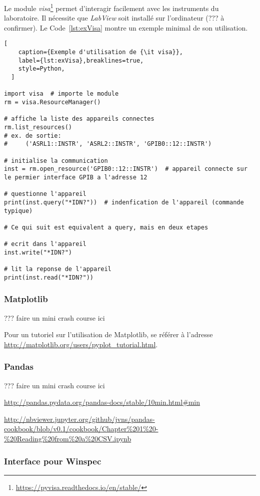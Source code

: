 \documentclass[11pt,francais]{book} %
\begin{document}
Le module {\it visa}\footnote{\url{https://pyvisa.readthedocs.io/en/stable/}} permet d'interagir facilement avec les instruments du laboratoire.
Il nécessite que {\it LabView} soit installé sur l'ordinateur (??? à confirmer).
Le Code~\ref{lst:exVisa} montre un exemple minimal de son utilisation.

\begin{lstlisting}[
    caption={Exemple d'utilisation de {\it visa}},
    label={lst:exVisa},breaklines=true,
    style=Python,
  ]  
 
import visa  # importe le module
rm = visa.ResourceManager()

# affiche la liste des appareils connectes
rm.list_resources()  
# ex. de sortie:
#     ('ASRL1::INSTR', 'ASRL2::INSTR', 'GPIB0::12::INSTR')

# initialise la communication
inst = rm.open_resource('GPIB0::12::INSTR')  # appareil connecte sur le permier interface GPIB a l'adresse 12

# questionne l'appareil
print(inst.query("*IDN?"))  # indenfication de l'appareil (commande typique)

# Ce qui suit est equivalent a query, mais en deux etapes

# ecrit dans l'appareil
inst.write("*IDN?")

# lit la reponse de l'appareil
print(inst.read("*IDN?"))

\end{lstlisting}

\subsubsection{Matplotlib}

??? faire un mini crash course ici

Pour un tutoriel sur l'utilisation de Matplotlib, se référer à l'adresse \url{http://matplotlib.org/users/pyplot_tutorial.html}.

\subsubsection{Pandas}

??? faire un mini crash course ici

\url{http://pandas.pydata.org/pandas-docs/stable/10min.html#min}

\url{http://nbviewer.jupyter.org/github/jvns/pandas-cookbook/blob/v0.1/cookbook/Chapter%201%20-%20Reading%20from%20a%20CSV.ipynb}


\subsubsection{Interface pour Winspec}
\end{document}
